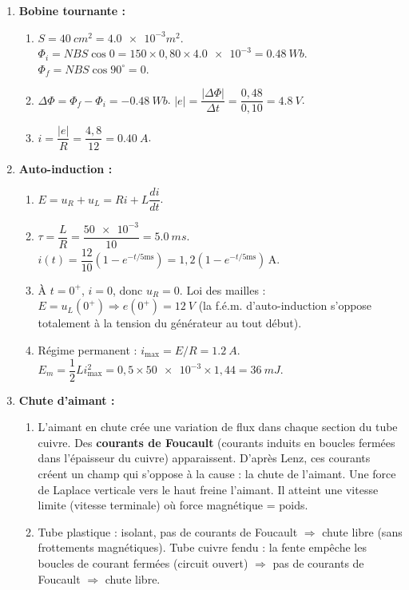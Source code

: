 \documentclass[11pt]{article}
\begin{document}
\begin{corrige}[Exercice n°1]
\begin{enumerate}
\item \textbf{Bobine tournante :}
\begin{enumerate}
\item $S = \SI{40}{cm^2} = \num{4,0e-3}{m^2}$. $\Phi_i = NBS\cos 0 = 150 \times 0,80 \times \num{4,0e-3} = \SI{0,48}{Wb}$. $\Phi_f = NBS\cos 90^\circ = 0$.
\item $\Delta\Phi = \Phi_f - \Phi_i = -\SI{0,48}{Wb}$. $|e| = \dfrac{|\Delta\Phi|}{\Delta t} = \dfrac{0,48}{0,10} = \SI{4,8}{V}$.
\item $i = \dfrac{|e|}{R} = \dfrac{4,8}{12} = \SI{0,40}{A}$.
\end{enumerate}
\item \textbf{Auto-induction :}
\begin{enumerate}
\item $E = u_R + u_L = Ri + L\dfrac{di}{dt}$.
\item $\tau = \dfrac{L}{R} = \dfrac{\num{50e-3}}{10} = \SI{5,0}{ms}$. $i(t) = \dfrac{12}{10}(1 - e^{-t/5\text{ms}}) = 1,2(1 - e^{-t/5\text{ms}})\,\mathrm{A}$.
\item À $t=0^+$, $i=0$, donc $u_R=0$. Loi des mailles : $E = u_L(0^+) \Rightarrow e(0^+) = \SI{12}{V}$ (la f.é.m. d'auto-induction s'oppose totalement à la tension du générateur au tout début).
\item Régime permanent : $i_{\text{max}} = E/R = \SI{1,2}{A}$. $E_m = \dfrac{1}{2} L i_{\text{max}}^2 = 0,5 \times \num{50e-3} \times 1,44 = \SI{36}{mJ}$.
\end{enumerate}
\item \textbf{Chute d'aimant :}
\begin{enumerate}
\item L'aimant en chute crée une variation de flux dans chaque section du tube cuivre. Des \textbf{courants de Foucault} (courants induits en boucles fermées dans l'épaisseur du cuivre) apparaissent. D'après Lenz, ces courants créent un champ qui s'oppose à la cause : la chute de l'aimant. Une force de Laplace verticale vers le haut freine l'aimant. Il atteint une vitesse limite (vitesse terminale) où force magnétique = poids.
\item Tube plastique : isolant, pas de courants de Foucault $\Rightarrow$ chute libre (sans frottements magnétiques). Tube cuivre fendu : la fente empêche les boucles de courant fermées (circuit ouvert) $\Rightarrow$ pas de courants de Foucault $\Rightarrow$ chute libre.
\end{enumerate}
\end{enumerate}
\end{corrige}
\end{document}
